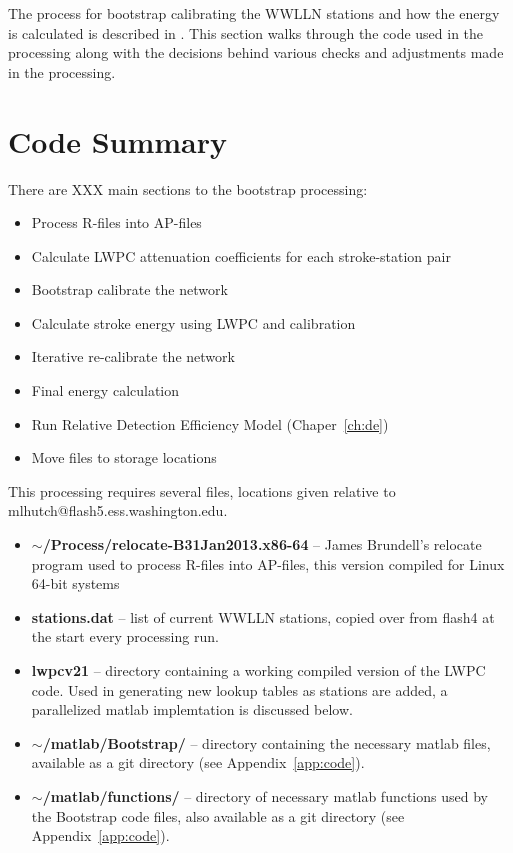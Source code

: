 The process for bootstrap calibrating the WWLLN stations and how the energy is calculated is described in \citet{Hutchins2012}.
This section walks through the code used in the processing along with the decisions behind various checks and adjustments made in the processing.

\section{Code Summary}

There are XXX main sections to the bootstrap processing:

\begin{itemize}
	\item{Process R-files into AP-files}
	\item{Calculate LWPC attenuation coefficients for each stroke-station pair}
	\item{Bootstrap calibrate the network}
	\item{Calculate stroke energy using LWPC and calibration}
	\item{Iterative re-calibrate the network}
	\item{Final energy calculation}
	\item{Run Relative Detection Efficiency Model (Chaper~\ref{ch:de})}
	\item{Move files to storage locations}
\end{itemize}

This processing requires several files, locations given relative to mlhutch@flash5.ess.washington.edu.

\begin{itemize}
	\item{\textbf{$\sim$/Process/relocate-B31Jan2013.x86-64} -- James Brundell's relocate program used to process R-files into AP-files, this version compiled for Linux 64-bit systems}
	\item{\textbf{stations.dat} -- list of current WWLLN stations, copied over from flash4 at the start every processing run.}
	\item{\textbf{lwpcv21} -- directory containing a working compiled version of the LWPC code.
		Used in generating new lookup tables as stations are added, a parallelized matlab implemtation is discussed below.}
	\item{\textbf{$\sim$/matlab/Bootstrap/} -- directory containing the necessary matlab files, available as a git directory (see Appendix~\ref{app:code}).}
	\item{\textbf{$\sim$/matlab/functions/} -- directory of necessary matlab functions used by the Bootstrap code files, also available as a git directory (see Appendix~\ref{app:code}).}
\end{itemize}

